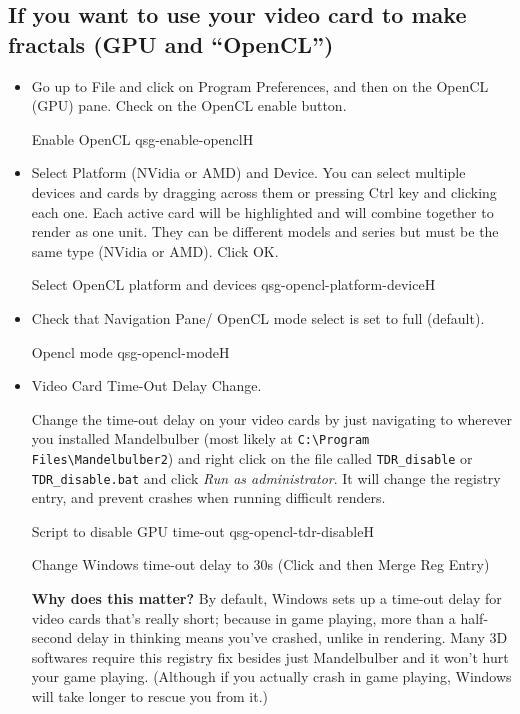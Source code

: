 \subsection{If you want to use your video card to make fractals (GPU and “OpenCL”)}\label{qsg-opencl}

\begin{itemize}
	\item   Go up to File and click on Program Preferences, and then on the OpenCL (GPU) pane. Check on the OpenCL enable button.

{Enable OpenCL}
{qsg-enable-opencl}{H}

	 \item Select Platform (NVidia or AMD) and Device. You can select multiple devices and cards by dragging across them or pressing Ctrl key and clicking each one. Each active card will be highlighted and will combine together to render as one unit. They can be different models and series but must be the same type (NVidia or AMD). Click OK.
	 
	 {Select OpenCL platform and devices}
	 {qsg-opencl-platform-device}{H}

     \item Check that Navigation Pane/ OpenCL mode select is set to full (default).
     
     {Opencl mode}
     {qsg-opencl-mode}{H}
     
      \item  Video Card Time-Out Delay Change. 

	Change the time-out delay on your video cards by just navigating to wherever you installed Mandelbulber (most likely at \texttt{C:\textbackslash Program Files\textbackslash Mandelbulber2}) and right click on the file called \texttt{TDR\_disable} or \texttt{TDR\_disable.bat} and click \emph{Run as administrator}. It will change the registry entry, and prevent crashes when running difficult renders. 	
		 
	{Script to disable GPU time-out}
	{qsg-opencl-tdr-disable}{H}
	
	Change Windows time-out delay to 30s (Click and then Merge Reg Entry)

\textbf{Why does this matter?} By default, Windows sets up a time-out delay for video cards that's really short; because in game playing, more than a half-second delay in thinking means you've crashed, unlike in rendering. Many 3D softwares require this registry fix besides just Mandelbulber and it won't hurt your game playing. (Although if you actually crash in game playing, Windows will take longer to rescue you from it.) 
\end{itemize}



